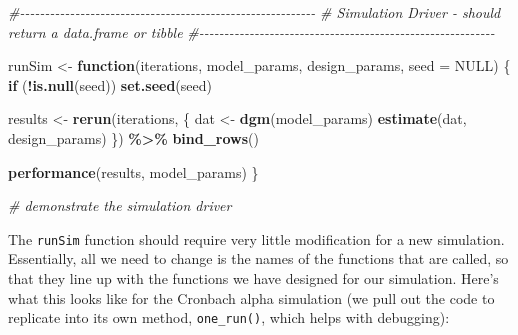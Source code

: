 \documentclass[
]{book}
\newenvironment{Shaded}{\begin{snugshade}}{\end{snugshade}}
\newcommand{\AttributeTok}[1]{\textcolor[rgb]{0.13,0.29,0.53}{#1}}
\newcommand{\CommentTok}[1]{\textcolor[rgb]{0.56,0.35,0.01}{\textit{#1}}}
\newcommand{\ConstantTok}[1]{\textcolor[rgb]{0.56,0.35,0.01}{#1}}
\newcommand{\ControlFlowTok}[1]{\textcolor[rgb]{0.13,0.29,0.53}{\textbf{#1}}}
\newcommand{\FunctionTok}[1]{\textcolor[rgb]{0.13,0.29,0.53}{\textbf{#1}}}
\newcommand{\NormalTok}[1]{#1}
\newcommand{\OtherTok}[1]{\textcolor[rgb]{0.56,0.35,0.01}{#1}}
\newcommand{\SpecialCharTok}[1]{\textcolor[rgb]{0.81,0.36,0.00}{\textbf{#1}}}
\begin{document}
\begin{Shaded}
\begin{Highlighting}[]
\CommentTok{\#{-}{-}{-}{-}{-}{-}{-}{-}{-}{-}{-}{-}{-}{-}{-}{-}{-}{-}{-}{-}{-}{-}{-}{-}{-}{-}{-}{-}{-}{-}{-}{-}{-}{-}{-}{-}{-}{-}{-}{-}{-}{-}{-}{-}{-}{-}{-}{-}{-}{-}{-}{-}{-}{-}{-}{-}{-}{-}{-}}
\CommentTok{\# Simulation Driver {-} should return a data.frame or tibble}
\CommentTok{\#{-}{-}{-}{-}{-}{-}{-}{-}{-}{-}{-}{-}{-}{-}{-}{-}{-}{-}{-}{-}{-}{-}{-}{-}{-}{-}{-}{-}{-}{-}{-}{-}{-}{-}{-}{-}{-}{-}{-}{-}{-}{-}{-}{-}{-}{-}{-}{-}{-}{-}{-}{-}{-}{-}{-}{-}{-}{-}{-}}

\NormalTok{runSim }\OtherTok{\textless{}{-}} \ControlFlowTok{function}\NormalTok{(iterations, model\_params, design\_params, }\AttributeTok{seed =} \ConstantTok{NULL}\NormalTok{) \{}
  \ControlFlowTok{if}\NormalTok{ (}\SpecialCharTok{!}\FunctionTok{is.null}\NormalTok{(seed)) }\FunctionTok{set.seed}\NormalTok{(seed)}

\NormalTok{  results }\OtherTok{\textless{}{-}} \FunctionTok{rerun}\NormalTok{(iterations, \{}
\NormalTok{                dat }\OtherTok{\textless{}{-}} \FunctionTok{dgm}\NormalTok{(model\_params)}
                \FunctionTok{estimate}\NormalTok{(dat, design\_params)}
\NormalTok{              \}) }\SpecialCharTok{\%\textgreater{}\%}
    \FunctionTok{bind\_rows}\NormalTok{()}
  

  \FunctionTok{performance}\NormalTok{(results, model\_params)}
\NormalTok{\}}

\CommentTok{\# demonstrate the simulation driver}
\end{Highlighting}
\end{Shaded}

The \texttt{runSim} function should require very little modification for a new simulation. Essentially, all we need to change is the names of the functions that are called, so that they line up with the functions we have designed for our simulation. Here's what this looks like for the Cronbach alpha simulation (we pull out the code to replicate into its own method, \texttt{one\_run()}, which helps with debugging):
\end{document}
